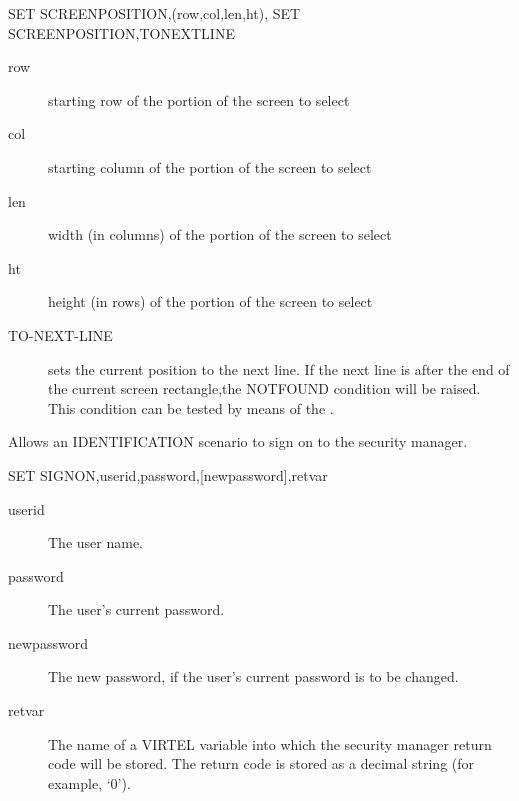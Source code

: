 \documentclass[letterpaper,10pt,english]{sphinxmanual}
\begin{document}
\begin{sphinxVerbatim}[commandchars=\\\{\}]
SET\PYGZdl{} SCREEN\PYGZhy{}POSITION,(row,col,len,ht),
SET\PYGZdl{} SCREEN\PYGZhy{}POSITION,TO\PYGZhy{}NEXT\PYGZhy{}LINE
\end{sphinxVerbatim}
\begin{description}
\item[{row}] \leavevmode
starting row of the portion of the screen to select

\item[{col}] \leavevmode
starting column of the portion of the screen to select

\item[{len}] \leavevmode
width (in columns) of the portion of the screen to select

\item[{ht}] \leavevmode
height (in rows) of the portion of the screen to select

\item[{TO-NEXT-LINE}] \leavevmode
sets the current position to the next line. If the next line is after the end of the current screen rectangle,the NOTFOUND condition will be raised. This condition can be tested by means of the {\hyperref[\detokenize{User_Guide:v457ug-if}]{}}.

\end{description}


Allows an IDENTIFICATION scenario to sign on to the security manager.

\begin{sphinxVerbatim}[commandchars=\\\{\}]
SET\PYGZdl{} SIGNON,\PYGZsq{}userid\PYGZsq{},\PYGZsq{}password\PYGZsq{},[\PYGZsq{}newpassword\PYGZsq{}],\PYGZsq{}retvar\PYGZsq{}
\end{sphinxVerbatim}
\begin{description}
\item[{userid}] \leavevmode
The user name.

\item[{password}] \leavevmode
The user’s current password.

\item[{newpassword}] \leavevmode
The new password, if the user’s current password is to be changed.

\item[{retvar}] \leavevmode
The name of a VIRTEL variable into which the security manager return code will be stored. The return code is stored as a decimal string (for example, ‘0’).

\end{description}
\end{document}
